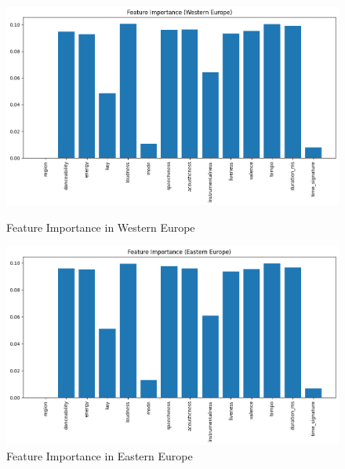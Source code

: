 \begin{figure}[h]
    \centering
    \begin{minipage}{0.45\textwidth}
        \centering
        \includegraphics[width=\linewidth]{media/rf_feature_imp_western_europe.png}
        \caption{Feature Importance in Western Europe}
    \end{minipage}%
    \hspace{0.05\textwidth} %
    \begin{minipage}{0.45\textwidth}
        \centering
        \includegraphics[width=\linewidth]{media/rf_feature_imp_eastern_europe.png}
        \caption{Feature Importance in Eastern Europe}
    \end{minipage}
\end{figure}

